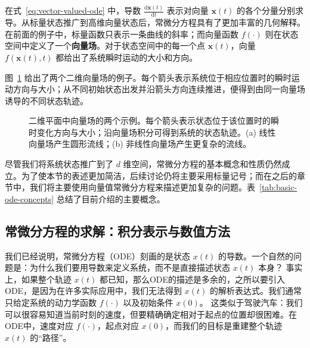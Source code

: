 在式~\eqref{eq:vector-valued-ode} 中，导数 \(\frac{\mathrm{d}\boldsymbol{x}(t)}{\mathrm{d}t}\) 表示对向量 \(\boldsymbol{x}(t)\) 的各个分量分别求导。从标量状态推广到高维向量状态后，常微分方程具有了更加丰富的几何解释。在前面的例子中，标量函数只表示一条曲线的斜率；而向量函数 \(f(\cdot)\) 则在状态空间中定义了一个\textbf{向量场}。对于状态空间中的每一个点 \(\boldsymbol{x}(t)\)，向量 \(f(\boldsymbol{x}(t),t)\) 都给出了系统瞬时运动的大小和方向。

图~\ref{fig:vector-field-examples} 给出了两个二维向量场的例子。每个箭头表示系统位于相应位置时的瞬时运动方向与大小；从不同初始状态出发并沿箭头方向连续推进，便得到由同一向量场诱导的不同状态轨迹。

\begin{figure}[!t]
\centering
{}
\caption{二维平面中向量场的两个示例。每个箭头表示状态位于该位置时的瞬时变化方向与大小；沿向量场积分可得到系统的状态轨迹。(a) 线性向量场产生圆形流线；(b) 非线性向量场产生更复杂的流线。}
\label{fig:vector-field-examples}
\end{figure}

尽管我们将系统状态推广到了 \(d\) 维空间，常微分方程的基本概念和性质仍然成立。为了使本节的表述更加简洁，后续讨论仍将主要采用标量记号；而在之后的章节中，我们将主要使用向量值常微分方程来描述更加复杂的问题。表~\ref{tab:basic-ode-concepts} 总结了目前介绍的主要概念。























\subsection{常微分方程的求解：积分表示与数值方法}
我们已经说明，常微分方程（ODE）刻画的是状态 $x(t)$ 的导数。一个自然的问题是：为什么我们要用导数来定义系统，而不是直接描述状态 $x(t)$ 本身？
事实上，如果整个轨迹 $x(t)$ 都已知，那么ODE的描述是多余的，之所以要引入 ODE，是因为在许多实际应用中，我们无法得到 $x(t)$ 的解析表达式。我们通常只给定系统的动力学函数 $f(\cdot)$ 以及初始条件 $x(0)$。
这类似于驾驶汽车：我们可以很容易知道当前时刻的速度，但要精确确定相对于起点的位置却很困难。在ODE中，速度对应 $f(\cdot)$，起点对应 $x(0)$，而我们的目标是重建整个轨迹 $x(t)$ 的“路径”。

